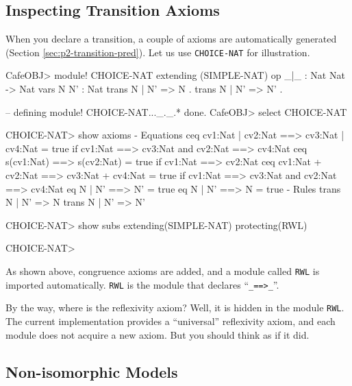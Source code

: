 \documentclass[a4paper]{memoir}
\begin{document}
\subsection{Inspecting Transition Axioms}\label{sec:p2-trans-beget-axs}

When you declare a transition, a couple of axioms are automatically
generated (Section \ref{sec:p2-transition-pred}). Let us use
\verb|CHOICE-NAT| for illustration.
\begin{vvtm}
\begin{ccode}
  CafeOBJ> module! CHOICE-NAT {
      extending (SIMPLE-NAT)
      op _|_ : Nat Nat -> Nat
      vars N N' : Nat
      trans N | N' => N .
      trans N | N' => N' .
    }

  -- defining module! CHOICE-NAT..._._.* done.
  CafeOBJ> select CHOICE-NAT

  CHOICE-NAT> show axioms
  - Equations
    ceq cv1:Nat | cv2:Nat ==> cv3:Nat | cv4:Nat = true 
        if cv1:Nat ==> cv3:Nat and cv2:Nat ==> cv4:Nat
    ceq s(cv1:Nat) ==> s(cv2:Nat) = true if cv1:Nat ==> cv2:Nat
    ceq cv1:Nat + cv2:Nat ==> cv3:Nat + cv4:Nat = true 
        if cv1:Nat ==> cv3:Nat and cv2:Nat ==> cv4:Nat
    eq N | N' ==> N' = true
    eq N | N' ==> N = true
  - Rules
    trans N | N' => N
    trans N | N' => N'

  CHOICE-NAT> show subs
  extending(SIMPLE-NAT)
  protecting(RWL)

  CHOICE-NAT> 
\end{ccode}
\end{vvtm}
As shown above, congruence axioms are added, and a
module called \verb|RWL| is imported automatically. \verb|RWL| is
the module that declares ``\verb|_==>_|''.

\begin{warning}
  By the way, where is the reflexivity axiom? Well, it is hidden
  in the module \verb|RWL|. The current implementation provides
  a ``universal'' reflexivity axiom, and each module does not
  acquire a new axiom. But you should think as if it did.
\end{warning}

\subsection{Non-isomorphic Models}\label{sec:p2-non-iso-model}
\end{document}
